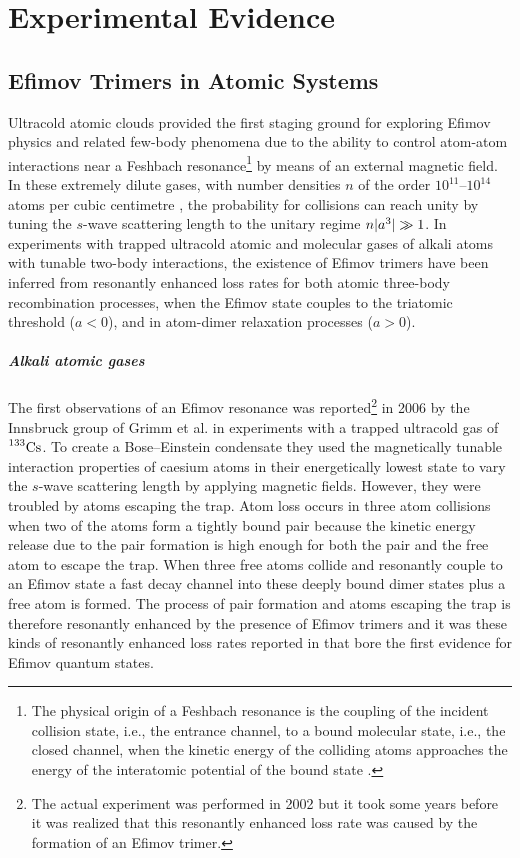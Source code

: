 \chapter{Experimental Evidence}\label{chap:2}
\section{Efimov Trimers in Atomic Systems}
Ultracold atomic clouds provided the first staging ground for exploring Efimov physics and related few-body phenomena due to the ability to control atom-atom interactions near a Feshbach resonance\footnote{The physical origin of a Feshbach resonance is the coupling of the incident collision state, i.e., the entrance channel, to a bound molecular state, i.e., the closed channel, when the kinetic energy of the colliding atoms approaches the energy of the interatomic potential of the bound state \cite{Feshbach}.} by means of an external magnetic field. In these extremely dilute gases, with number densities $n$ of the order $10^{11}$--$10^{14}$ atoms per cubic centimetre \cite{virulh2008condensed}, the probability for collisions can reach unity by tuning the $s$-wave scattering length to the unitary regime $n\lvert a^3\rvert\gg1$. In experiments with trapped ultracold atomic and molecular gases of alkali atoms with tunable two-body interactions, the existence of Efimov trimers have been inferred from resonantly enhanced loss rates for both atomic three-body recombination processes, when the Efimov state couples to the triatomic threshold ($a<0$), and in atom-dimer relaxation processes ($a>0$). 
\paragraph{Alkali atomic gases} 
The first observations of an Efimov resonance was reported\footnote{The actual experiment was performed in 2002 but it took some years before it was realized that this resonantly enhanced loss rate was caused by the formation of an Efimov trimer.} in 2006 by the Innsbruck group of Grimm et al. in experiments with a trapped ultracold gas of $\prescript{133}{}{\mathrm{Cs}}$. To create a Bose--Einstein condensate they used the magnetically tunable interaction properties of caesium atoms in their energetically lowest state to vary the $s$-wave scattering length by applying magnetic fields. However, they were troubled by atoms escaping the trap. Atom loss occurs in three atom collisions when two of the atoms form a tightly bound pair because the kinetic energy release due to the pair formation is high enough for both the pair and the free atom to escape the trap. When three free atoms collide and resonantly couple to an Efimov state a fast decay channel into these deeply bound dimer states plus a free atom is formed. The process of pair formation and atoms escaping the trap is therefore resonantly enhanced by the presence of Efimov trimers and it was these kinds of resonantly enhanced loss rates reported in \cite{Grimm:2006} that bore the first evidence for Efimov quantum states.

